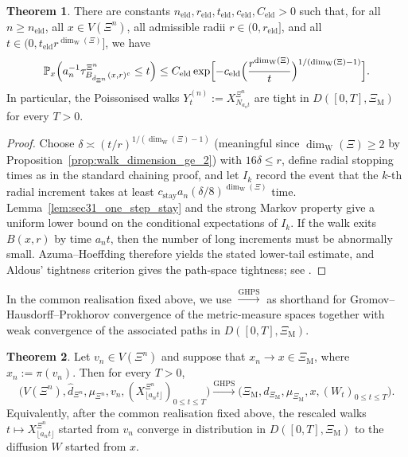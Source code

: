 \documentclass{article}
\theoremstyle{plain}
\theoremstyle{definition}
\newtheorem{theorem}{Theorem}[section]
\newcommand{\dimwalk}{\dim_\mathrm{W}}
\begin{document}
\begin{theorem}\label{thm:sec31_discrete_eld_tightness}
There are constants $n_{\mathrm{eld}},r_{\mathrm{eld}},t_{\mathrm{eld}},c_{\mathrm{eld}},C_{\mathrm{eld}}>0$ such that, for all $n\ge n_{\mathrm{eld}}$, all $x\in V(\Xi^n)$, all admissible radii $r\in(0,r_{\mathrm{eld}}]$, and all $t\in(0,t_{\mathrm{eld}}r^{\dimwalk(\Xi)}]$, we have
\[
\mathbb P_x\Bigl(a_n^{-1}\tau_{B_{\hat d_{\Xi^n}}(x,r)^c}^{\Xi^n}\le t\Bigr)
\le
C_{\mathrm{eld}}
\exp\Bigl[-c_{\mathrm{eld}}
\Bigl(\frac{r^{\dimwalk(\Xi)}}{t}\Bigr)^{1/(\dimwalk(\Xi)-1)}\Bigr].
\]
In particular, the Poissonised walks $Y_t^{(n)}:=X_{N_{a_nt}}^{\Xi^n}$ are tight in $D([0,T],\Xi_{\mathrm M})$ for every $T>0$.
\end{theorem}

\begin{proof}
Choose $\delta\asymp (t/r)^{1/(\dimwalk(\Xi)-1)}$ (meaningful since $\dimwalk(\Xi)\ge 2$ by Proposition~\ref{prop:walk_dimension_ge_2}) with $16\delta\le r$, define radial stopping times as in the standard chaining proof, and let $I_k$ record the event that the $k$-th radial increment takes at least $c_{\mathrm{stay}}a_n(\delta/8)^{\dimwalk(\Xi)}$ time.
Lemma~\ref{lem:sec31_one_step_stay} and the strong Markov property give a uniform lower bound on the conditional expectations of $I_k$.
If the walk exits $B(x,r)$ by time $a_nt$, then the number of long increments must be abnormally small.
Azuma--Hoeffding therefore yields the stated lower-tail estimate, and Aldous' tightness criterion gives the path-space tightness; see \cite{azuma1967weighted,aldous1978stopping,billingsley1999convergence}.
\end{proof}



In the common realisation fixed above, we use
$\overset{\mathrm{GHPS}}{\longrightarrow}$
as shorthand for Gromov--Hausdorff--Prokhorov convergence of the metric-measure spaces together with weak convergence of the associated paths in $D([0,T],\Xi_{\mathrm M})$.



\begin{theorem}\label{thm:sec31_ghps}
Let $v_n\in V(\Xi^n)$ and suppose that $x_n\to x\in \Xi_{\mathrm M}$, where $x_n:=\pi(v_n)$.
Then for every $T>0$,
\[
\bigl(V(\Xi^n),\hat d_{\Xi^n},\mu_{\Xi^n},v_n,(X_{\lfloor a_nt\rfloor}^{\Xi^n})_{0\le t\le T}\bigr)
\overset{\mathrm{GHPS}}{\longrightarrow}
\bigl(\Xi_{\mathrm M},d_{\Xi_{\mathrm M}},\mu_{\Xi_{\mathrm M}},x,(W_t)_{0\le t\le T}\bigr).
\]
Equivalently, after the common realisation fixed above, the rescaled walks
$t\mapsto X_{\lfloor a_nt\rfloor}^{\Xi^n}$ started from $v_n$ converge in distribution in
$D([0,T],\Xi_{\mathrm M})$ to the diffusion $W$ started from $x$.
\end{theorem}
\end{document}
